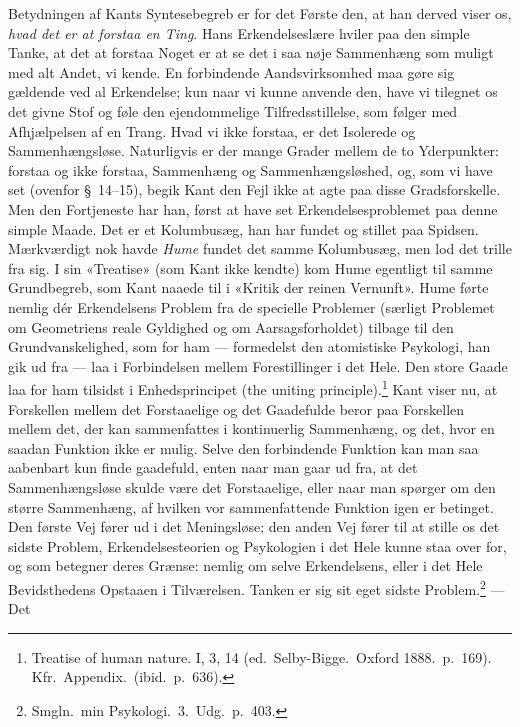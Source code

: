 \documentclass[12pt,a4paper]{article}
\newcommand{\apage}[1]{\marginnote{\footnotesize\textit{[#1]}}}
\begin{document}
Betydningen af Kants Syntesebegreb er for det Første den, at han derved
viser os, \emph{hvad det er at forstaa en Ting}. Hans Erkendelseslære hviler paa
den simple Tanke, at det at forstaa Noget er at se det i saa nøje
Sammenhæng som muligt med alt Andet, vi kende. En forbindende
Aandsvirksomhed maa gøre sig gældende ved al Erkendelse; kun naar vi
kunne anvende den, have vi tilegnet os det givne Stof og føle den
ejendommelige Tilfredsstillelse, som følger med Afhjælpelsen af en Trang.
Hvad vi ikke forstaa, er det Isolerede og Sammenhængsløse. Naturligvis er
der mange Grader mellem de to Yderpunkter: forstaa og ikke forstaa,
Sammenhæng og Sammenhængsløshed, og, som vi have set (ovenfor §\ 14--15),
begik Kant den Fejl ikke at agte paa disse Gradsforskelle. Men den
Fortjeneste har han, først at have set Erkendelsesproblemet paa denne
simple Maade. Det er et Kolumbusæg, han har fundet og stillet paa
Spidsen. Mærkværdigt nok havde \emph{Hume} fundet det samme Kolumbusæg, men lod
det trille fra sig. I sin «Treatise» (som Kant ikke kendte) kom Hume
egentligt til samme Grundbegreb, som Kant naaede til i «Kritik der reinen
Vernunft». Hume førte nemlig dér Erkendelsens Problem fra de specielle
Problemer (særligt Problemet om Geometriens reale Gyldighed og om
Aarsagsforholdet) tilbage til den Grundvanskelighed, som for ham ---
formedelst den atomistiske Psykologi, han gik ud fra --- laa i
Forbindelsen mellem Forestillinger i det Hele. Den store Gaade laa for
ham tilsidst i Enhedsprincipet (the uniting
principle).\footnote{Treatise of human nature. I, 3, 14 (ed.\
Selby-Bigge.\ Oxford 1888.\ p.\ 169). Kfr.\ Appendix.\ (ibid.\ p.\ 636).}
Kant viser nu, at Forskellen mellem det Forstaaelige og det Gaadefulde
beror paa Forskellen mellem det, der kan sammenfattes i kontinuerlig
Sammenhæng, og det, hvor en saadan Funktion ikke er mulig. Selve den
forbindende Funktion kan man saa aabenbart kun finde gaadefuld, enten
naar man gaar ud fra, at det Sammenhængsløse skulde være det Forstaaelige,
eller naar man spørger om den større Sammenhæng, af hvilken vor
sammenfattende Funktion igen er betinget. Den første Vej fører ud i det
Meningsløse; den anden Vej fører \apage{57}  til at stille os det sidste Problem,
Erkendelsesteorien og Psykologien i det Hele kunne staa over for, og som
betegner deres Grænse: nemlig om selve Erkendelsens, eller i det Hele
Bevidsthedens Opstaaen i Tilværelsen. Tanken er sig sit eget sidste
Problem.\footnote{Smgln.\ min Psykologi.\ 3.\ Udg.\ p.\ 403.} --- Det
\end{document}
